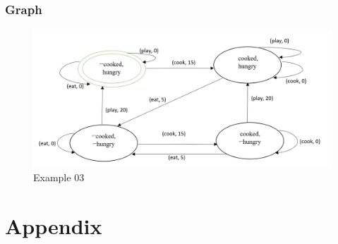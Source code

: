 \documentclass[11pt]{article}
\begin{document}
	\subsubsection{Graph}\label{par:p403}
	\begin{figure}[H]
		\includegraphics[width=1\linewidth, height=0.3\textheight]{./media/figure01.png}
		\caption{Example 03}
		\label{Figure:f03}
	\end{figure}
	\newpage
	\section{Appendix}	
	\begin{appendix}
		\listoffigures
		\listoftables
	\end{appendix}
\end{document}
